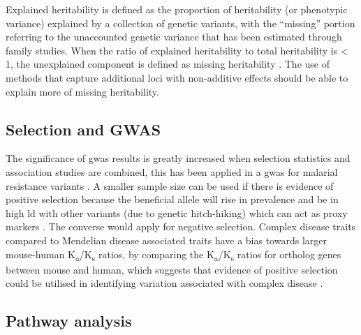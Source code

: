 \documentclass[]{report}
\begin{document}
Explained heritability is defined as the proportion of heritability (or
phenotypic variance) explained by a collection of genetic variants, with
the ``missing'' portion referring to the unaccounted genetic variance
that has been estimated through family studies. When the ratio of
explained heritability to total heritability is \textless{} 1, the
unexplained component is defined as missing heritability
\citep{Zuk2012}. The use of methods that capture additional loci with
non-additive effects should be able to explain more of missing
heritability.

\subsection{Selection and GWAS}\label{selection-and-gwas}

The significance of \gls{gwas} results is greatly increased when
selection statistics and association studies are combined, this has been
applied in a \gls{gwas} for malarial resistance variants
\citep{Ayodo2007}. A smaller sample size can be used if there is
evidence of positive selection because the beneficial allele will rise
in prevalence and be in high \gls{ld} with other variants (due to
genetic hitch-hiking) which can act as proxy markers
\citep{Karlsson2014}. The converse would apply for negative selection.
Complex disease traits compared to Mendelian disease associated traits
have a bias towards larger mouse-human
K\textsubscript{a}/K\textsubscript{s} ratios, by comparing the
K\textsubscript{a}/K\textsubscript{s} ratios for ortholog genes between
mouse and human, which suggests that evidence of positive selection
could be utilised in identifying variation associated with complex
disease \citep{Thomas2004}.

\subsection{Pathway analysis}\label{pathway-analysis}
\end{document}
